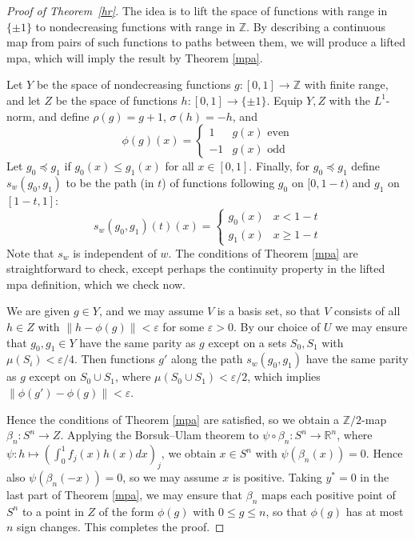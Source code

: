 \documentclass[11pt, reqno, english]{amsart}
\theoremstyle{plain}
\theoremstyle{definition}
\newcommand{\R}{\mathbb{R}}
\newcommand{\Z}{\mathbb{Z}}
\begin{document}
\begin{proof}[Proof of Theorem~\ref{hr}]
  The idea is to lift the space of functions with range in $\{\pm 1\}$ to
  nondecreasing functions with range in $\mathbb{Z}$. By describing a
  continuous map from pairs of such functions to paths between them, we will
  produce a lifted mpa, which will imply the result by Theorem \ref{mpa}.

  Let $Y$ be the space of nondecreasing functions $g\colon [0, 1] \rightarrow
  \mathbb{Z}$ with finite range, and let $Z$ be the space of functions $h\colon
  [0, 1] \rightarrow \{\pm 1\}$. Equip $Y, Z$ with the $L^{1}$-norm, and define
  $\rho(g) = g + 1$, $\sigma(h) = -h$, and
  $$\phi(g)(x) = \begin{cases}
    1 & g(x) \text{ even}\\
    -1 & g(x) \text{ odd}
  \end{cases}$$
  Let $g_{0} \preceq g_{1}$ if $g_{0}(x) \le g_{1}(x)$ for all $x \in [0, 1]$.
  Finally, for $g_{0} \preceq g_{1}$ define $s_{w}(g_{0}, g_{1})$ to be the
  path (in $t$) of functions following $g_{0}$ on $[0, 1 - t)$ and $g_{1}$ on
  $[1 - t, 1]$:
  $$s_{w}(g_{0}, g_{1})(t)(x) = \begin{cases}
    g_{0}(x) & x < 1 - t\\
    g_{1}(x) & x \ge 1 - t
  \end{cases}$$
  Note that $s_{w}$ is independent of $w$. The conditions of Theorem \ref{mpa}
  are straightforward to check, except perhaps the continuity property in the
  lifted mpa definition, which we check now.
  
  We are given $g \in Y$, and we may assume $V$ is a basis set, so that $V$
  consists of all $h \in Z$ with $\|h - \phi(g)\| < \varepsilon$ for some
  $\varepsilon > 0$. By our choice of $U$ we may ensure that $g_{0}, g_{1} \in
  Y$ have the same parity as $g$ except on a sets $S_{0}, S_{1}$ with
  $\mu(S_{i}) < \varepsilon / 4$. Then functions $g'$ along the path
  $s_{w}(g_{0}, g_{1})$ have the same parity as $g$ except on $S_{0} \cup
  S_{1}$, where $\mu(S_{0} \cup S_{1}) < \varepsilon / 2$, which implies
  $\|\phi(g') - \phi(g)\| < \varepsilon$.

  Hence the conditions of Theorem \ref{mpa} are satisfied, so we obtain a
  $\Z/2$-map $\beta_{n}\colon S^{n} \rightarrow Z$. Applying the Borsuk--Ulam theorem to
  $\psi \circ \beta_{n}\colon S^{n} \rightarrow \R^{n}$, where $\psi\colon h
  \mapsto (\int_{0}^{1}f_{j}(x)h(x)dx)_{j}$, we obtain $x \in S^{n}$ with
  $\psi(\beta_{n}(x)) = 0$. Hence also $\psi(\beta_{n}(-x)) = 0$, so we may
  assume $x$ is positive. Taking $y^{*} = 0$ in the last part of Theorem
  \ref{mpa}, we may ensure that $\beta_{n}$ maps each positive point of $S^{n}$
  to a point in $Z$ of the form $\phi(g)$ with $0 \le g \le n$, so that
  $\phi(g)$ has at most $n$ sign changes. This completes the proof.
\end{proof}
\end{document}
